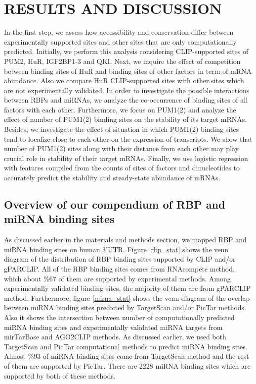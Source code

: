 \chapter{RESULTS AND DISCUSSION}
\label{chp:chapter4}

In the first step, we assess how accessibility and conservation differ between experimentally supported sites and other sites that are only computationally predicted. Initially, we perform this analysis considering CLIP-supported sites of PUM2, HuR, IGF2BP1-3 and QKI. Next, we inquire the effect of competition between binding sites of HuR and binding sites of other factors in term of mRNA abundance. Also we compare HuR CLIP-supported sites with other sites which are not experimentally validated. In order to investigate the possible interactions between RBPs and miRNAs, we analyze the co-occurrence of binding sites of all factors with each other. Furthermore, we focus on PUM1(2) and analyze the effect of number of PUM1(2) binding sites on the stability of its target mRNAs. Besides, we investigate the effect of situation in which PUM1(2) binding sites tend to localize close to each other on the expression of transcripts. We show that number of PUM1(2) sites along with their distance from each other may play crucial role in stability of their target mRNAs. Finally, we use logistic regression with features compiled from the counts of sites of factors and dinucleotides to accurately predict the stability and steady-state abundance of mRNAs.

\section{Overview of our compendium of RBP and miRNA binding sites}

As discussed earlier in the materials and methods section, we mapped RBP and miRNA binding sites on human 3'UTR. Figure \ref{rbp_stat} shows the venn diagram of the distribution of RBP binding sites supported by CLIP and/or gPARCLIP. All of the RBP binding sites comes from RNAcompete method, which about \%67 of them are supported by experimental methods. Among experimentally validated binding sites, the majority of them are from gPARCLIP method. Furthermore, figure \ref{mirna_stat} shows the venn diagram of the overlap between miRNA binding sites predicted by TargetScan and/or PicTar methods. Also it shows the intersection between number of computationally predicted miRNA binding sites and experimentally validated miRNA targets from mirTarBase and AGO2CLIP methods. As discussed earlier, we used both TargetScan and PicTar computational methods to predict miRNA binding sites. Almost \%93 of miRNA binding sites come from TargetScan method and the rest of them are supported by PicTar. There are 2228 miRNA binding sites which are supported by both of these methods.

